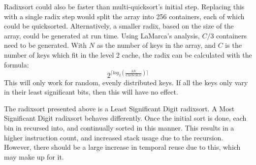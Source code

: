 Radixsort could also be faster than multi-quicksort's initial step. Replacing
this with a single radix step would split the array into 256 containers, each of
which could be quicksorted. Alternatively, a smaller radix, based on the size of
the array, could be generated at run time. Using LaMarca's analysis,
$C/3$ containers need to be generated. With $N$ as the number of keys in the
array, and $C$ is the number of keys which fit in the level 2 cache, the radix
can be calculated with the formula:
$$2^{\lceil{}log_2(\frac{3N}{CacheSize})\rceil{}}$$
This will only work for random, evenly distributed keys. If all the keys only
vary in their least significant bits, then this will have no effect.

The radixsort presented above is a Least Significant Digit radixsort. A Most
Significant Digit radixsort behaves differently. Once the initial sort is done, each
bin in recursed into, and continually sorted in this manner. This results in a
higher instruction count, and increased stack usage due to the recursion.
However, there should be a large increase in temporal reuse due to this, which
may make up for it.
